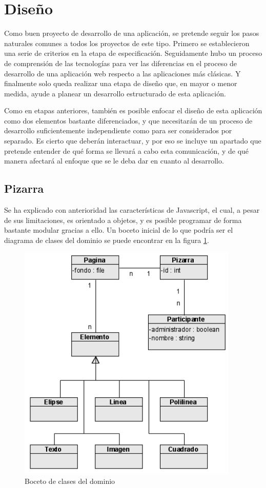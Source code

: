 
\section{Diseño} %
\label{sec:diseno}
Como buen proyecto de desarrollo de una aplicación, se pretende seguir los pasos naturales comunes a todos los proyectos de este tipo. Primero se establecieron una serie de criterios en la etapa de especificación. Seguidamente hubo un proceso de comprensión de las tecnologías para ver las diferencias en el proceso de desarrollo de una aplicación web respecto a las aplicaciones más clásicas. Y finalmente solo queda realizar una etapa de diseño que, en mayor o menor medida, ayude a planear un desarrollo estructurado de esta aplicación.

Como en etapas anteriores, también es posible enfocar el diseño de esta aplicación como dos elementos bastante diferenciados, y que necesitarán de un proceso de desarrollo suficientemente independiente como para ser considerados por separado. Es cierto que deberán interactuar, y por eso se incluye un apartado que pretende entender de qué forma se llevará a cabo esta comunicación, y de qué manera afectará al enfoque que se le deba dar en cuanto al desarrollo.

\subsection{Pizarra}
Se ha explicado con anterioridad las características de Javascript, el cual, a pesar de sus limitaciones, es orientado a objetos, y es posible programar de forma bastante modular gracias a ello. Un boceto inicial de lo que podría ser el diagrama de clases del dominio se puede encontrar en la figura \ref{fig:jsdom1}.

\begin{figure}[h!]
\centering
\includegraphics[width=10.5cm]{javascript-dominio1.png}
\caption{Boceto de clases del dominio}\label{fig:jsdom1}
\end{figure}

